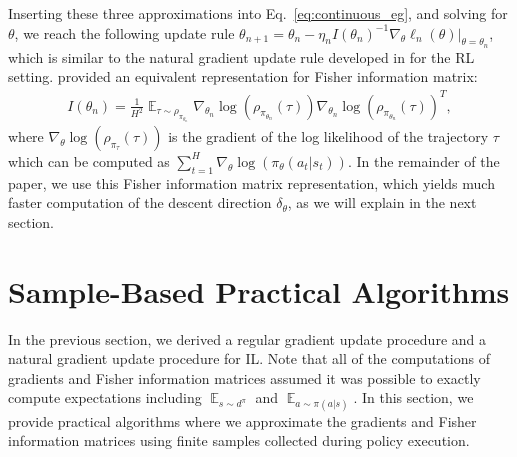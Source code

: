 \documentclass{article}
\newcommand{\BB}[1]{\textcolor{red}{\bf Byron: {#1}}}
\begin{document}
Inserting these three approximations into Eq.~\ref{eq:continuous_eg}, and solving for $\theta$, we reach the following update rule $\theta_{n+1} = \theta_n - \eta_{n}I(\theta_n)^{-1}\nabla_{\theta}\ell_n(\theta)|_{\theta =\theta_n}$,
which is similar to the natural gradient update rule developed in \cite{kakade2002natural} %
for the RL setting. 
\citet{bagnell2003covariant} provided an equivalent representation for  Fisher information matrix: %
\begin{align}
\label{eq:fisher_traj}
I(\theta_n )=\frac{1}{H^2}\mathop{\mathop{\mathbb{E}}}_{\tau\sim \rho_{\pi_{\theta_n}}}\nabla_{\theta_n}\log(\rho_{\pi_{\theta_n}}(\tau))\nabla_{\theta_n}\log(\rho_{\pi_{\theta_n}}(\tau))^T,
\end{align} where $\nabla_{\theta}\log(\rho_{\pi_{\tau}}(\tau))$ is the gradient of the log likelihood of the trajectory $\tau$ which can be computed as $\sum_{t=1}^H\nabla_{\theta}\log(\pi_{\theta}(a_t|s_t))$. In the remainder of the paper, we use this Fisher information matrix representation, which yields much faster computation of the descent direction $\delta_\theta$, as we will explain in the next section.





\section{Sample-Based Practical Algorithms}
In the previous section, we derived a regular gradient update procedure and a natural gradient update procedure for IL. Note that all of the computations of gradients and Fisher information matrices assumed it was possible to exactly compute expectations including $\mathop{\mathbb{E}}_{s\sim d^{\pi}}$ and $\mathop{\mathbb{E}}_{a\sim \pi(a|s)}$. In this section, we provide practical algorithms where we approximate the gradients and Fisher information matrices using finite samples collected during policy execution. 
\end{document}
